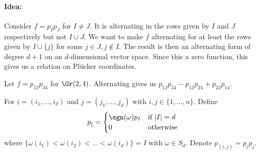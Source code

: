 \documentclass{skript}
\begin{document}
\paragraph{Idea:} Consider $f=p_Ip_J$ for $I\neq J$. 
It is alternating in the rows given by $I$ and $J$ respectively but not $I\cup J$.
We want to make $f$ alternating for at least the rows given by $I\cup\{j\}$ for some $j\in J, j\not\in I$.
The result is then an alternating form of degree $d+1$ on an $d$-dimensional vector space.
Since this a zero function, this gives us a relation on Plücker coordinates.

\begin{bsp}
    Let $f=p_{12}p_{34}$ for $\Gr(2,4)$.
    Alternating gives us $p_{12}p_{34} - p_{13}p_{24} + p_{23}p_{14}$.
\end{bsp}

\begin{definition}[Alternation]\label{def:alternation}
    For $\underline i = (i_1,\dots, i_d)$ and $\underline j = (j_1,\dots, j_d)$ with $i,j\in \{1,\dots, n\}$. 
    Define \begin{align*}p_{\underline i} = \begin{cases} \sgn(\omega) p_I & \text{if } |I| = d\\ 0 &\text{otherwise}\end{cases} \end{align*}
    where $\{\omega(i_1)< \omega(i_2) < \dots < \omega(i_d)\} = I$ with $\omega \in S_d$.
    Denote $p_{(\underline i, \underline j)} = p_{\underline i}p_{\underline j}$.
\end{definition}
\end{document}
